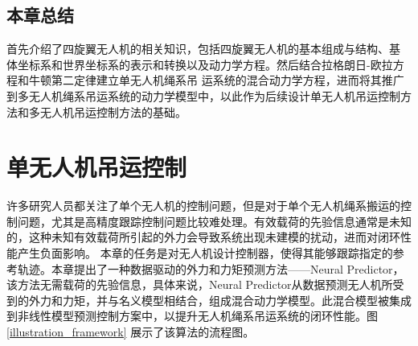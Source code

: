 \documentclass[lang=chs, degree=master, blindreview=true, winfonts=true]{yanputhesis}
\begin{document}

\section{本章总结}
首先介绍了四旋翼无人机的相关知识，包括四旋翼无人机的基本组成与结构、基
体坐标系和世界坐标系的表示和转换以及动力学方程。然后结合拉格朗日-欧拉方程和牛顿第二定律建立单无人机绳系吊
运系统的混合动力学方程，进而将其推广到多无人机绳系吊运系统的动力学模型中，以此作为后续设计单无人机吊运控制方法和多无人机吊运控制方法的基础。
\cleardoublepage

\chapter{单无人机吊运控制}

许多研究人员都关注了单个无人机的控制问题，但是对于单个无人机绳系搬运的控制问题，尤其是高精度跟踪控制问题比较难处理。有效载荷的先验信息通常是未知的，这种未知有效载荷所引起的外力会导致系统出现未建模的扰动，进而对闭环性能产生负面影响。
本章的任务是对无人机设计控制器，使得其能够跟踪指定的参考轨迹。本章提出了一种数据驱动的外力和力矩预测方法——Neural Predictor，该方法无需载荷的先验信息，具体来说，Neural Predictor从数据预测无人机所受到的外力和力矩，并与名义模型相结合，组成混合动力学模型。此混合模型被集成到非线性模型预测控制方案中，以提升无人机绳系吊运系统的闭环性能。图 \ref{illustration_framework} 展示了该算法的流程图。
\end{document}
